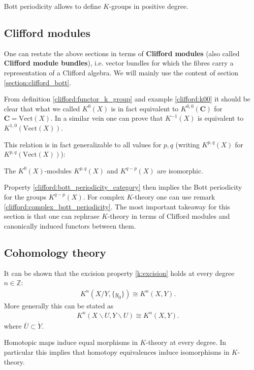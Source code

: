 {    \begin{remark}
        Bott periodicity allows to define $K$-groups in positive degree.
    \end{remark}

\subsection{Clifford modules}

    One can restate the above sections in terms of \textbf{Clifford modules} (also called \textbf{Clifford module bundles}), i.e. vector bundles for which the fibres carry a representation of a Clifford algebra. We will mainly use the content of section \ref{section:clifford_bott}.

    From definition \ref{clifford:functor_k_group} and example \ref{clifford:k00} it should be clear that what we called $K^0(X)$ is in fact equivalent to $K^{0,0}(\mathbf{C})$ for $\mathbf{C}=\text{Vect}(X)$. In a similar vein one can prove that $K^{-1}(X)$ is equivalent to $K^{1,0}(\text{Vect}(X))$.

    This relation is in fact generalizable to all values for $p,q$ (writing $K^{p,q}(X)$ for $K^{p,q}(\text{Vect}(X))$):
    \begin{property}
        The $K^0(X)$-modules $K^{p,q}(X)$ and $K^{q-p}(X)$ are isomorphic.
    \end{property}

    Property \ref{clifford:bott_periodicity_category} then implies the Bott periodicity for the groups $K^{q-p}(X)$. For complex $K$-theory one can use remark \ref{clifford:complex_bott_periodicity}. The most important takeaway for this section is that one can rephrase $K$-theory in terms of Clifford modules and canonically induced functors between them.

\subsection{Cohomology theory}

    \begin{property}[Excision]
        It can be shown that the excision property \ref{k:excision} holds at every degree $n\in\mathbb{Z}$:
        \begin{gather}
            K^n(X/Y, \{y_0\})\cong K^n(X, Y).
        \end{gather}
        More generally this can be stated as
        \begin{gather}
            K^n(X\backslash U, Y\backslash U)\cong K^n(X, Y).
        \end{gather}
        where $\overline{U}\subset\mathring{Y}$.
    \end{property}
    \begin{property}
        Homotopic maps induce equal morphisms in $K$-theory at every degree. In particular this implies that homotopy equivalences induce isomorphisms in $K$-theory.
    \end{property}

}
